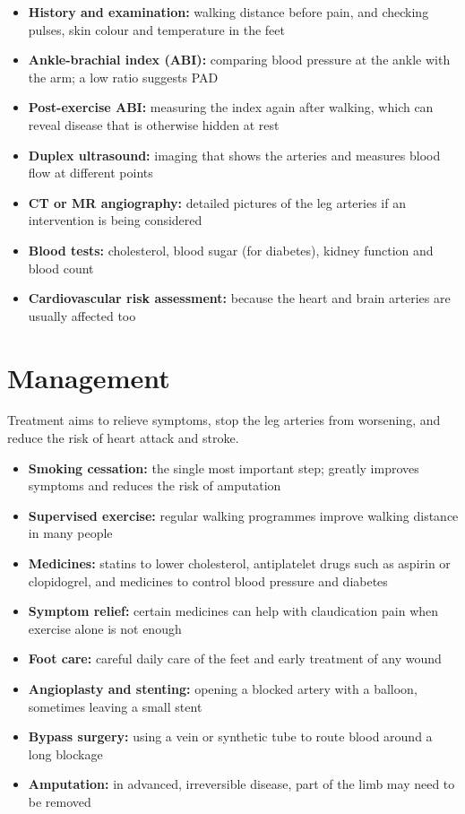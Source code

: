 \begin{itemize}
    \item \textbf{History and examination:} walking distance before pain, and checking pulses, skin colour and temperature in the feet
    \item \textbf{Ankle-brachial index (ABI):} comparing blood pressure at the ankle with the arm; a low ratio suggests PAD
    \item \textbf{Post-exercise ABI:} measuring the index again after walking, which can reveal disease that is otherwise hidden at rest
    \item \textbf{Duplex ultrasound:} imaging that shows the arteries and measures blood flow at different points
    \item \textbf{CT or MR angiography:} detailed pictures of the leg arteries if an intervention is being considered
    \item \textbf{Blood tests:} cholesterol, blood sugar (for diabetes), kidney function and blood count
    \item \textbf{Cardiovascular risk assessment:} because the heart and brain arteries are usually affected too
\end{itemize}

\section*{Management}
Treatment aims to relieve symptoms, stop the leg arteries from worsening, and reduce the risk of heart attack and stroke.

\begin{itemize}
    \item \textbf{Smoking cessation:} the single most important step; greatly improves symptoms and reduces the risk of amputation
    \item \textbf{Supervised exercise:} regular walking programmes improve walking distance in many people
    \item \textbf{Medicines:} statins to lower cholesterol, antiplatelet drugs such as aspirin or clopidogrel, and medicines to control blood pressure and diabetes
    \item \textbf{Symptom relief:} certain medicines can help with claudication pain when exercise alone is not enough
    \item \textbf{Foot care:} careful daily care of the feet and early treatment of any wound
    \item \textbf{Angioplasty and stenting:} opening a blocked artery with a balloon, sometimes leaving a small stent
    \item \textbf{Bypass surgery:} using a vein or synthetic tube to route blood around a long blockage
    \item \textbf{Amputation:} in advanced, irreversible disease, part of the limb may need to be removed
\end{itemize}

